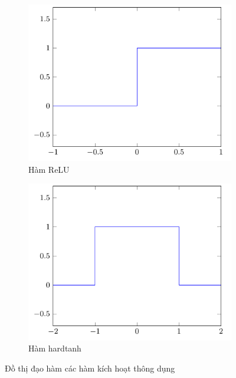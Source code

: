 \begin{figure}[htbp]
\begin{subfigure}[b]{0.33\textwidth}
        \centering
        \includegraphics[width=\textwidth]{tikz_image/diff_relu.pdf}
        \caption{Hàm ReLU}
    \end{subfigure}%
    \begin{subfigure}[b]{0.33\textwidth}
        \centering
        \includegraphics[width=\textwidth]{tikz_image/diff_hardtanh.pdf}
        \caption{Hàm hardtanh}
    \end{subfigure}%
    \caption{Đồ thị đạo hàm các hàm kích hoạt thông dụng}
    \label{figure:differential-activation-funtion}
\end{figure}

